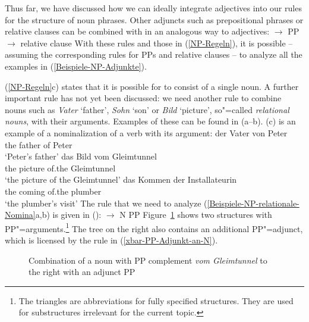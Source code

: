 \noindent
Thus far, we have discussed how we can ideally integrate adjectives into our rules for the structure of noun phrases.
Other adjuncts such as prepositional phrases or relative clauses can be combined with \nbar in an analogous way to adjectives:
\eal
\ex\label{xbar-PP-Adjunkt-an-N} \nbar $\to$ \nbar PP
\ex \nbar $\to$ \nbar relative clause
\zl
With these rules and those in (\ref{NP-Regeln}), it is possible -- assuming the corresponding rules for PPs and
relative clauses -- to analyze all the examples in (\ref{Beispiele-NP-Adjunkte}).

(\ref{NP-Regeln}c) states that it is possible for \nbar to consist of a single noun. A further important rule has not yet been
discussed: we need another rule to combine nouns such as \emph{Vater} `father', \emph{Sohn} `son' or \emph{Bild} `picture', 
so"=called \emph{relational nouns}, with their arguments. Examples of these can be found in (a--b).
(c) is an example of a nominalization of a verb with its argument:
\eal
\label{Beispiele-NP-relationale-Nomina}
\ex 
\gll der Vater von Peter\\
	 the father of Peter\\
\glt `Peter's father'
\ex 
\gll das Bild vom Gleimtunnel\\
	 the picture of.the Gleimtunnel\\
\glt `the picture of the Gleimtunnel'
\ex 
\gll das Kommen der Installateurin\\
	 the coming of.the plumber\\
\glt `the plumber's visit'
\zl
\noindent
The rule that we need to analyze (\ref{Beispiele-NP-relationale-Nomina}a,b) is given in
():
\ea
\nbar $\to$ N PP
\z
%
Figure~\ref{Abbildung-NP-mit-PP-Argument} shows two structures with PP"=arguments.\footnote{
The triangles are abbreviations for fully specified structures. They are used for substructures
irrelevant for the current topic.} The tree on the right also contains an additional PP"=adjunct, which is licensed
by the rule in (\ref{xbar-PP-Adjunkt-an-N}).
\begin{figure}
\caption{\label{Abbildung-NP-mit-PP-Argument}Combination of a noun with PP complement
  \emph{vom Gleimtunnel} to the right with an adjunct PP}
\end{figure}%


